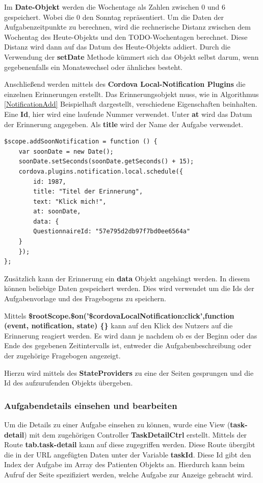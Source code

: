 Im \textbf{Date-Objekt} werden die Wochentage als Zahlen zwischen 0 und 6 gespeichert. Wobei die 0 den Sonntag repräsentiert.
Um die Daten der Aufgabenzeitpunkte zu berechnen, wird die rechnerische Distanz zwischen dem Wochentag des Heute-Objekts und den TODO-Wochentagen berechnet.
Diese Distanz wird dann auf das Datum des Heute-Objekts addiert. Durch die Verwendung der \textbf{setDate} Methode kümmert sich das Objekt selbst darum, wenn gegebenenfalls ein Monatswechsel oder ähnliches besteht.

Anschließend werden mittels des \textbf{Cordova Local-Notification Plugins} die einzelnen Erinnerungen erstellt. Das Erinnerungsobjekt muss, wie in Algorithmus \ref{NotificationAdd} Beispielhaft dargestellt, verschiedene Eigenschaften beinhalten. Eine \textbf{Id}, hier wird eine laufende Nummer verwendet. Unter \textbf{at} wird das Datum der Erinnerung angegeben.
Als \textbf{title} wird der Name der Aufgabe verwendet.

\begin{lstlisting}[caption={Beispiel einer Funktion zum hinzufügen einer Betriebssystemerinnerung},label=NotificationAdd]
$scope.addSoonNotification = function () {
	var soonDate = new Date();
	soonDate.setSeconds(soonDate.getSeconds() + 15);
	cordova.plugins.notification.local.schedule({
		id: 1987,
		title: "Titel der Erinnerung",
		text: "Klick mich!",
		at: soonDate,
		data: {
		QuestionnaireId: "57e795d2db97f7bd0ee6564a"
	}
	});
};
\end{lstlisting}

Zusätzlich kann der Erinnerung  ein \textbf{data} Objekt angehängt werden. In diesem können beliebige Daten gespeichert werden. Dies wird verwendet um die Ids der Aufgabenvorlage und des Fragebogens zu speichern. 

Mittels \textbf{\$rootScope.\$on('\$cordovaLocalNotification:click',function (event, notification, state) \{\}} kann auf den Klick des Nutzers auf die Erinnerung reagiert werden. Es wird dann je nachdem ob es der Beginn oder das Ende des gegebenen Zeitintervalls ist, entweder die Aufgabenbeschreibung oder der zugehörige Fragebogen angezeigt.

Hierzu wird mittels des \textbf{StateProviders} zu eine der Seiten gesprungen und die Id des aufzurufenden Objekts übergeben.

\subsubsection{Aufgabendetails einsehen und bearbeiten}\label{_ImpPCAufgabenDetail}
Um die Details zu einer Aufgabe einsehen zu können, wurde eine View (\textbf{task-detail}) mit dem zugehörigen Controller \textbf{TaskDetailCtrl} erstellt. Mittels der Route \textbf{tab.task-detail} kann auf diese zugegriffen werden. Diese Route übergibt die in der URL angefügten Daten unter der Variable \textbf{taskId}. Diese Id gibt den Index der Aufgabe im Array des Patienten Objekts an. Hierdurch kann beim Aufruf der Seite spezifiziert werden, welche Aufgabe zur Anzeige gebracht wird.


